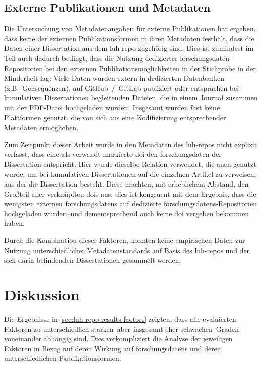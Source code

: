 \subsection{Externe Publikationen und Metadaten}\label{sec:luh-repo-results-external-metadata}
Die Untersuchung von Metadatenangaben für externe Publikationen hat ergeben, dass keine der externen Publikationsformen in ihren Metadaten festhält, dass die Daten einer Dissertation aus dem \gls{luh-repo} zugehörig sind.
Dies ist zumindest im Teil auch dadurch bedingt, dass die Nutzung dedizierter \gls{forschungsdaten}-Repositorien bei den externen Publikationsmöglichkeiten in der Stichprobe in der Minderheit lag:
Viele Daten wurden extern in dedizierten Datenbanken (z.B.~Gensequenzen), auf GitHub~/~GitLab publiziert oder entsprachen bei kumulativen Dissertationen begleitenden Dateien, die in einem Journal zusammen mit der PDF-Datei hochgeladen wurden.
Insgesamt wurden fast keine Plattformen genutzt, die von sich aus eine Kodifizierung entsprechender Metadaten ermöglichen.

Zum Zeitpunkt dieser Arbeit wurde in den Metadaten des \gls{luh-repo}s nicht explizit verfasst, dass eine als verwandt markierte \gls{doi} den \gls{forschungsdaten} der Dissertation entspricht.
Hier wurde dieselbe Relation verwendet, die auch genutzt wurde, um bei kumulativen Dissertationen auf die einzelnen Artikel zu verweisen, aus der die Dissertation besteht.
Diese machten, mit erheblichem Abstand, den Großteil aller verknüpften \glspl{doi} aus; dies ist kongruent mit dem Ergebnis, dass die wenigsten externen \glspl{forschungsdaten} auf dedizierte \glspl{forschungsdaten}-Repositorien hochgeladen wurden--und dementsprechend auch keine \gls{doi} vergeben bekommen haben.

Durch die Kombination dieser Faktoren, konnten keine empirischen Daten zur Nutzung unterschiedlicher Metadatenstandards auf Basis des \gls{luh-repo}s und der sich darin befindenden Dissertationen gesammelt werden.

\section{Diskussion}\label{sec:luh-repo-discussion}
Die Ergebnisse in \cref{sec:luh-repo-results-factors} zeigten, dass alle evaluierten Faktoren zu unterschiedlich starken--aber insgesamt eher schwachen--Graden voneinander abhängig sind.
Dies verkompliziert die Analyse der jeweiligen Faktoren in Bezug auf deren Wirkung auf \glspl{forschungsdaten} und deren unterschiedlichen Publikationsformen.

